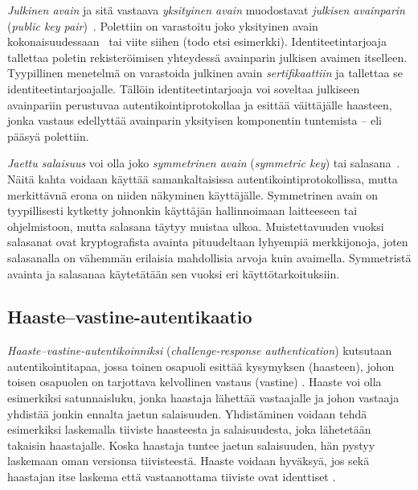 \documentclass[finnish,gradu]{tktltiki}
\begin{document}
  \emph{Julkinen avain} ja sitä vastaava \emph{yksityinen avain} muodostavat \emph{julkisen avainparin} (\emph{public key pair})~\cite{NIST_SP800-63-1}.
  Polettiin on varastoitu joko yksityinen avain kokonaisuudessaan~\cite{NIST_SP800-63-1} tai viite siihen (todo etsi esimerkki).
  Identiteetintarjoaja tallettaa poletin rekisteröimisen yhteydessä avainparin julkisen avaimen itselleen. Tyypillinen menetelmä on varastoida julkinen avain \emph{sertifikaattiin} ja tallettaa se identiteetintarjoajalle. Tällöin identiteetintarjoaja voi soveltaa julkiseen avainpariin perustuvaa autentikointiprotokollaa ja esittää väittäjälle haasteen, jonka vastaus edellyttää avainparin yksityisen komponentin tuntemista -- eli pääsyä polettiin.

  \emph{Jaettu salaisuus} voi olla joko \emph{symmetrinen avain} (\emph{symmetric key}) tai salasana~\cite{NIST_SP800-63-1}. Näitä kahta voidaan käyttää samankaltaisissa autentikointiprotokollissa, mutta merkittävnä erona on niiden näkyminen käyttäjälle. Symmetrinen avain on tyypillisesti kytketty johnonkin käyttäjän hallinnoimaan laitteeseen tai ohjelmistoon, mutta salasana täytyy muistaa ulkoa. Muistettavuuden vuoksi salasanat ovat kryptografista avainta pituudeltaan lyhyempiä merkkijonoja, joten salasanalla on vähemmän erilaisia mahdollisia arvoja kuin avaimella. Symmetristä avainta ja salasanaa käytetätään sen vuoksi eri käyttötarkoituksiin.



  \subsection{Haaste--vastine-autentikaatio} %
  \label{sub:haaste_vastine_autentikaatio}

  \emph{Haaste--vastine-autentikoinniksi} (\emph{challenge-response authentication}) kutsutaan autentikointitapaa, jossa toinen osapuoli esittää kysymyksen (haasteen), johon toisen osapuolen on tarjottava kelvollinen vastaus (vastine) \cite{NIST_SP800-63-1}. Haaste voi olla esimerkiksi satunnaisluku, jonka haastaja lähettää vastaajalle ja johon vastaaja yhdistää jonkin ennalta jaetun salaisuuden. Yhdistäminen voidaan tehdä esimerkiksi laskemalla tiiviste haasteesta ja salaisuudesta, joka lähetetään takaisin haastajalle. Koska haastaja tuntee jaetun salaisuuden, hän pystyy laskemaan oman versionsa tiivisteestä. Haaste voidaan hyväksyä, jos sekä haastajan itse laskema että vastaanottama tiiviste ovat identtiset \cite{NIST_SP800-63-1}.
\end{document}
